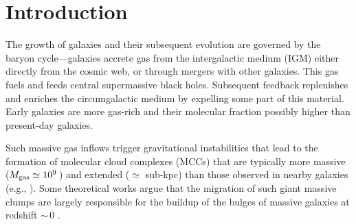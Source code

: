 \IfFileExists{emulateapjlegacy.cls}{\documentclass[iop]{emulateapjlegacy}}{\documentclass[iop]{emulateapj}}
\begin{document}

\section{Introduction}
The growth of galaxies and their subsequent evolution are governed by the baryon cycle---galaxies accrete gas from the intergalactic medium (IGM)
     either directly from the cosmic web, or through mergers with other galaxies. This gas fuels \SF and feeds central
supermassive black holes. Subsequent feedback replenishes and enriches the circumgalactic medium
   by expelling some
part of this material.
    Early
galaxies
are more gas-rich and their molecular fraction possibly higher
   than
present-day galaxies.

Such massive gas inflows trigger gravitational instabilities that lead to the formation of molecular
   cloud complexes (MCCs)
that are typically more massive ($M_{\rm gas}\simeq 10^9$\,\Msun) and extended ($\simeq$ sub-kpc) than those observed in nearby galaxies (e.g., \citealt{Gabor13a, Hopkins14a, Inoue16a}).
%
Some theoretical works argue that the migration of such giant massive clumps are largely responsible for the buildup of the bulges of massive galaxies at redshift \z$\sim$\,0 \citep[e.g.,][]{Ceverino10a}.
\end{document}
